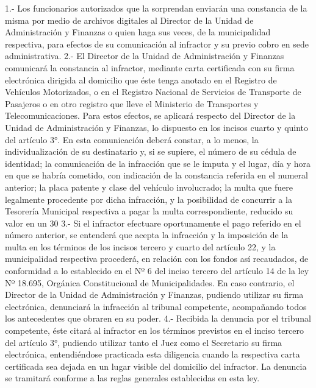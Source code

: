     1.- Los funcionarios autorizados que la sorprendan enviarán una constancia de la misma por medio de archivos digitales al Director de la Unidad de Administración y Finanzas o quien haga sus veces, de la municipalidad respectiva, para efectos de su comunicación al infractor y su previo cobro en sede administrativa.
    2.- El Director de la Unidad de Administración y Finanzas comunicará la constancia al infractor, mediante carta certificada con su firma electrónica dirigida al domicilio que éste tenga anotado en el Registro de Vehículos Motorizados, o en el Registro Nacional de Servicios de Transporte de Pasajeros o en otro registro que lleve el Ministerio de Transportes y Telecomunicaciones. Para estos efectos, se aplicará respecto del Director de la Unidad de Administración y Finanzas, lo dispuesto en los incisos cuarto y quinto del artículo 3°. En esta comunicación deberá constar, a lo menos, la individualización de su destinatario y, si se supiere, el número de su cédula de identidad; la comunicación de la infracción que se le imputa y el lugar, día y hora en que se habría cometido, con indicación de la constancia referida en el numeral anterior; la placa patente y clase del vehículo involucrado; la multa que fuere legalmente procedente por dicha infracción, y la posibilidad de concurrir a la Tesorería Municipal respectiva a pagar la multa correspondiente, reducido su valor en un 30%
    3.- Si el infractor efectuare oportunamente el pago referido en el número anterior, se entenderá que acepta la infracción y la imposición de la multa en los términos de los incisos tercero y cuarto del artículo 22, y la municipalidad respectiva procederá, en relación con los fondos así recaudados, de conformidad a lo establecido en el Nº 6 del inciso tercero del artículo 14 de la ley Nº 18.695, Orgánica Constitucional de Municipalidades. En caso contrario, el Director de la Unidad de Administración y Finanzas, pudiendo utilizar su firma electrónica, denunciará la infracción al tribunal competente, acompañando todos los antecedentes que obraren en su poder.
    4.- Recibida la denuncia por el tribunal competente, éste citará al infractor en los términos previstos en el inciso tercero del artículo 3°, pudiendo utilizar tanto el Juez como el Secretario su firma electrónica, entendiéndose practicada esta diligencia cuando la respectiva carta certificada sea dejada en un lugar visible del domicilio del infractor. La denuncia se tramitará conforme a las reglas generales establecidas en esta ley.


